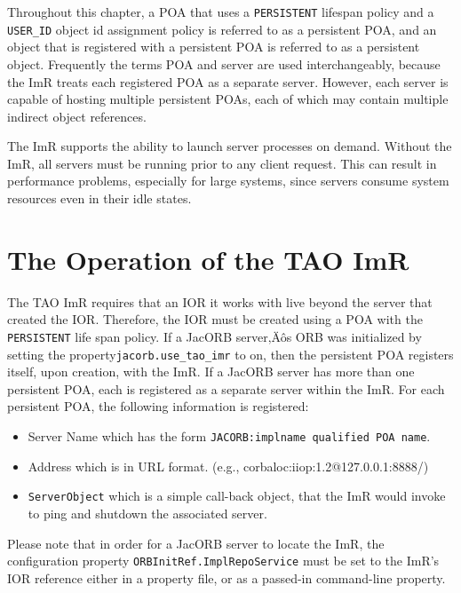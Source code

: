 Throughout this chapter, a POA that uses a {\tt PERSISTENT} lifespan
policy and  a {\tt USER\_ID} object id assignment policy is referred to as
a persistent POA, and an object that is registered with a persistent POA is
referred to as a persistent object.  Frequently the terms POA and server are
used interchangeably, because the ImR treats each registered POA as a
separate server. However, each server is capable of hosting multiple
persistent POAs, each of which may contain multiple indirect object
references.

The ImR supports the ability to launch server processes on demand.
Without the ImR, all servers must be running prior to any client request.
This can result in performance problems, especially for large systems,
since servers consume system resources even in their idle states.

\section{The Operation of the TAO ImR}

The TAO ImR requires that an IOR it works with live beyond the server
that created the IOR. Therefore, the IOR must be created using a POA with
the {\tt PERSISTENT} life span policy. If a JacORB server‚Äôs ORB was
initialized by setting the property{\tt  jacorb.use\_tao\_imr} to on, then the
persistent POA registers itself, upon creation, with the ImR.  If a JacORB
server has more than one persistent POA, each is registered as a separate
server within the ImR. For each persistent POA, the following information
is registered:

\begin{itemize}
     \item Server Name which has the form
       {\tt JACORB:implname qualified POA name}.
     \item Address which is in URL format.
              (e.g., corbaloc:iiop:1.2@127.0.0.1:8888/)
     \item {\tt ServerObject} which is a simple call-back object, that the
               ImR would invoke to ping and shutdown the associated server.
\end{itemize}

Please note that in order for a JacORB server to locate the ImR,
the configuration property {\tt ORBInitRef.ImplRepoService} must be set to
the ImR's IOR reference  either in a property file, or as a passed-in
command-line property.

